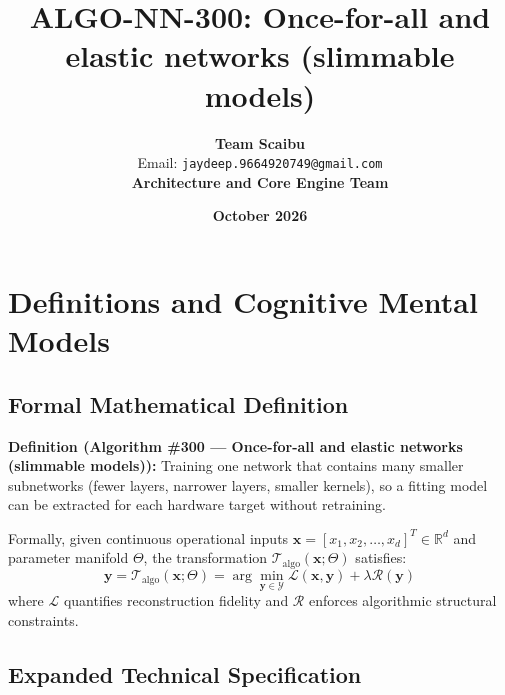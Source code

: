 \documentclass[11pt,a4paper]{article}
\title{\textbf{ALGO-NN-300: Once-for-all and elastic networks (slimmable models)}}
\author{\textbf{Team Scaibu} \\ \small Email: \texttt{jaydeep.9664920749@gmail.com} \\ \small \textbf{Architecture and Core Engine Team}}
\date{\textbf{October 2026}}
\theoremstyle{definition}
\begin{document}
\maketitle

\section{Definitions and Cognitive Mental Models}

\subsection{Formal Mathematical Definition}
\textbf{Definition (Algorithm \#300 --- Once-for-all and elastic networks (slimmable models)):}
Training one network that contains many smaller subnetworks (fewer layers, narrower layers, smaller kernels), so a fitting model can be extracted for each hardware target without retraining.

Formally, given continuous operational inputs $\mathbf{x} = [x_1, x_2, \dots, x_d]^T \in \mathbb{R}^d$ and parameter manifold $\Theta$, the transformation $\mathcal{T}_{\text{algo}}(\mathbf{x}; \Theta)$ satisfies:
{\boldmath
\begin{equation}
\mathbf{y} = \mathcal{T}_{\text{algo}}(\mathbf{x}; \Theta) = \arg\min_{\mathbf{y} \in \mathcal{Y}} \mathcal{L}(\mathbf{x}, \mathbf{y}) + \lambda \mathcal{R}(\mathbf{y})
\end{equation}
}
where $\mathcal{L}$ quantifies reconstruction fidelity and $\mathcal{R}$ enforces algorithmic structural constraints.

\subsection{Expanded Technical Specification}
\end{document}
